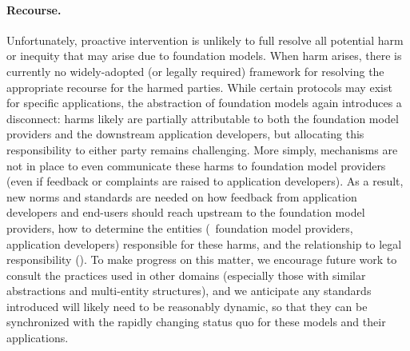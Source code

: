 \paragraph{Recourse.}
Unfortunately, proactive intervention is unlikely to full resolve all potential harm or inequity that may arise due to foundation models.
When harm arises, there is currently no widely-adopted (or legally required) framework for resolving the appropriate recourse for the harmed parties.
While certain protocols may exist for specific applications, the abstraction of foundation models again introduces a disconnect: harms likely are partially attributable to both the foundation model providers and the downstream application developers, but allocating this responsibility to either party remains challenging.
More simply, mechanisms are not in place to even communicate these harms to foundation model providers (even if feedback or complaints are raised to application developers).
As a result, new norms and standards are needed on  how  feedback from  application developers and end-users should reach upstream to the foundation model providers, how to determine the entities (\eg~foundation model providers, application developers) responsible for these harms, and the relationship to legal responsibility ().
To make progress on this matter, we encourage future work to consult the practices used in other domains (especially those with similar abstractions and multi-entity structures), and we anticipate any standards introduced will likely need to be reasonably dynamic, so that they can be synchronized with the rapidly changing status quo for these models and their applications.

